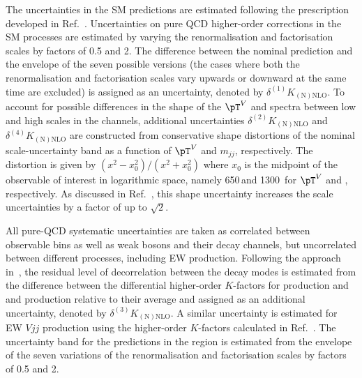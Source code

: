 \documentclass[atlasdraft=false, cernpreprint, UKenglish, texmf, orcidlogo]{atlasdoc}
\begin{document}
The uncertainties in the SM predictions are estimated following the prescription developed in Ref.~\cite{Lindert:2017olm}.
Uncertainties on pure QCD higher-order corrections in the SM processes are estimated by varying the renormalisation and
factorisation scales by factors of 0.5 and 2. The difference between the nominal prediction
and the envelope of the seven possible versions (the cases where both the renormalisation and
factorisation scales vary upwards or downward at the same time are excluded) is assigned as an uncertainty,
denoted by $\delta^{(1)}K_\mathrm{(N)NLO}$. To account for possible differences in the shape
of the $\pT^V$ and \mjj spectra between low and high scales in the \vjj{} channels,
additional uncertainties $\delta^{(2)}K_\mathrm{(N)NLO}$ and $\delta^{(4)}K_\mathrm{(N)NLO}$
are constructed from conservative shape distortions of the nominal scale-uncertainty band
as a function of $\pT^V$ and $m_{jj}$, respectively.
The distortion is given by $(x^2 - x_0^2) / (x^2 + x_0^2)$ where $x_0$ is the midpoint of the
observable of interest in logarithmic space, namely 650\,\GeV and 1300\,\GeV
for $\pT^V$ and \mjj, respectively. As discussed in Ref.~\cite{Lindert:2017olm}, this
shape uncertainty increases the scale uncertainties by a factor of up to $\sqrt{2}$.
 
All pure-QCD systematic uncertainties are taken as correlated between observable bins
as well as weak bosons and their decay channels,
but uncorrelated between different processes, including EW \vjj{} production.
Following the approach in~\cite{Lindert:2017olm}, the residual level of decorrelation between
the decay modes is estimated from the difference between the differential higher-order $K$-factors
for \wjets production and \Zlljets and \Zvvjets production relative to their average
and assigned as an additional uncertainty, denoted by $\delta^{(3)}K_\mathrm{(N)NLO}$.
A similar uncertainty is estimated for EW $Vjj$ production using the
higher-order $K$-factors calculated in Ref.~\cite{Lindert:2022ejn}.
The uncertainty band for the \HEJ predictions in the \vbf region is estimated from the envelope
of the seven variations of the renormalisation and factorisation scales by factors of 0.5 and 2.
 
\end{document}
